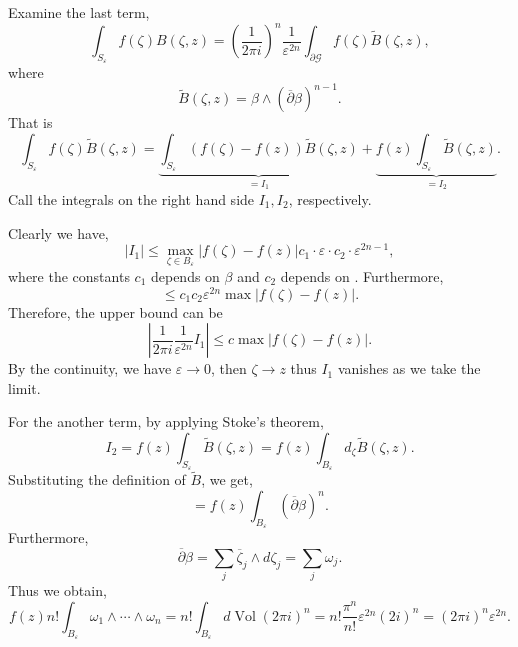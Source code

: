 \documentclass{article}
\DeclareMathOperator{\Vol}{Vol}
\newcommand{\bd}[0]{\partial}
\begin{document}
Examine the last term,
\begin{equation*}
  \int_{S_\varepsilon}f(\zeta)B(\zeta,z) = \left({\frac 1 {2\pi i}}\right)^{n}{\frac 1 {\varepsilon^{2n}}}\int_{\bd\mathcal{G}}f(\zeta)\tilde{B}(\zeta,z),
\end{equation*}
where
\begin{equation*}
  \tilde{B}(\zeta,z) = \beta\wedge(\overline{\partial}\beta)^{n-1}.
\end{equation*}
That is 
\begin{equation*}
  \int_{S_\varepsilon}f(\zeta)\tilde{B}(\zeta,z) = \underbrace{\int_{S_\varepsilon}(f(\zeta)-f(z))\tilde{B}(\zeta,z)}_{=I_1}+\underbrace{f(z)\int_{S_\varepsilon}\tilde{B}(\zeta,z)}_{=I_2}.
\end{equation*}
Call the integrals on the right hand side $I_1,I_2$, respectively. 
\par Clearly we have,
\begin{equation*}
  \vert I_1\vert \leq\max_{\zeta\in B_\varepsilon}\vert f(\zeta)-f(z)\vert c_1\cdot\varepsilon\cdot c_2\cdot \varepsilon^{2n-1},
\end{equation*}
where the constants $c_1$ depends on $\beta$ and $c_2$ depends on .%
Furthermore,
\begin{equation*}
  \leq c_1c_2\varepsilon^{2n}\max\vert f(\zeta)-f(z)\vert.
\end{equation*}
Therefore, the upper bound can be 
\begin{equation*}
  \left\vert {\frac 1 {2\pi i}}{\frac 1 {\varepsilon^{2n}}}I_1\right\vert\leq c\max\vert f(\zeta)-f(z)\vert.
\end{equation*}
By the continuity, we have $\varepsilon\to0$, then $\zeta\to z$ thus $I_1$ vanishes as we take the limit.
\par For the another term, by applying Stoke's theorem, 
\begin{equation*}
  I_2 = f(z)\int_{S_{\varepsilon}} \tilde{B}(\zeta,z) = f(z)\int_{B_\varepsilon}d_\zeta \tilde{B}(\zeta,z).
\end{equation*}
Substituting the definition of $\tilde{B}$, we get,
\begin{equation*}
  = f(z)\int_{B_\varepsilon}(\overline{\partial}\beta)^n.
\end{equation*}
Furthermore,
\begin{equation*}
  \overline{\partial}\beta = \sum_j\overline{\zeta}_j\wedge d\zeta_j = \sum_j\omega_j.
\end{equation*}
Thus we obtain,
\begin{equation*}
  f(z)n!\int_{B_\varepsilon}\omega_1\wedge\cdots\wedge\omega_n = n!\int_{B_\varepsilon}d\Vol(2\pi i)^n = n!{\frac {\pi^n} {n!}}\varepsilon^{2n}(2 i)^n = (2\pi i)^n\varepsilon^{2n}.
\end{equation*}
\end{document}
